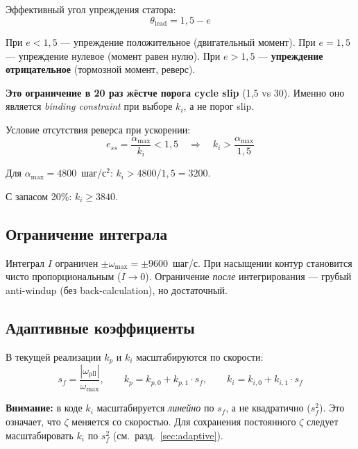 \documentclass[12pt,a4paper]{article}
\begin{document}
Эффективный угол упреждения статора:
\begin{equation}
  \theta_\text{lead} = 1{,}5 - e
\end{equation}

При $e < 1{,}5$ --- упреждение положительное (двигательный момент).
При $e = 1{,}5$ --- упреждение нулевое (момент равен нулю).
При $e > 1{,}5$ --- \textbf{упреждение отрицательное} (тормозной момент, реверс).

\textbf{Это ограничение в 20 раз жёстче порога cycle slip} (1{,}5 vs 30).
Именно оно является \emph{binding constraint} при выборе $k_i$,
а не порог slip.

Условие отсутствия реверса при ускорении:
\begin{equation}
  \boxed{e_{ss} = \frac{\alpha_\text{max}}{k_i} < 1{,}5
  \quad\Longrightarrow\quad
  k_i > \frac{\alpha_\text{max}}{1{,}5}}
  \label{eq:ki_reversal}
\end{equation}

Для $\alpha_\text{max} = 4800$~шаг/с$^2$:
$k_i > 4800 / 1{,}5 = 3200$.

С запасом 20\%: $k_i \ge 3840$.

\subsection{Ограничение интеграла}

Интеграл $I$ ограничен $\pm\omega_\text{max} = \pm 9600$~шаг/с.
При насыщении контур становится чисто пропорциональным ($\dot{I} \to 0$).
Ограничение \emph{после} интегрирования --- грубый anti-windup
(без back-calculation), но достаточный.

\subsection{Адаптивные коэффициенты}

В текущей реализации $k_p$ и $k_i$ масштабируются по скорости:
\begin{equation*}
  s_f = \frac{|\omega_\text{pll}|}{\omega_\text{max}}, \qquad
  k_p = k_{p,0} + k_{p,1} \cdot s_f, \qquad
  k_i = k_{i,0} + k_{i,1} \cdot s_f
\end{equation*}

\textbf{Внимание:} в коде $k_i$ масштабируется \emph{линейно} по $s_f$,
а не квадратично ($s_f^2$). Это означает, что $\zeta$ меняется со
скоростью. Для сохранения постоянного $\zeta$ следует масштабировать
$k_i$ по $s_f^2$ (см.~разд.~\ref{sec:adaptive}).
\end{document}
